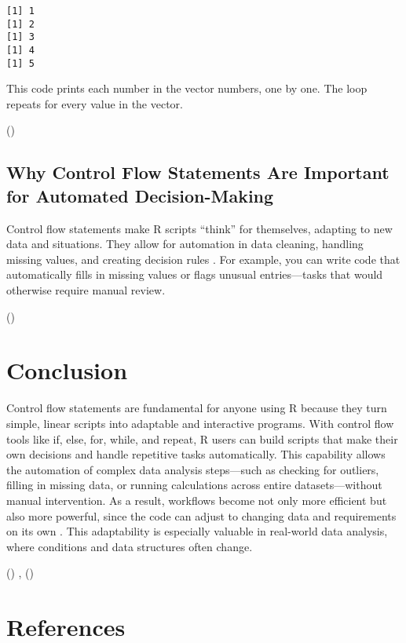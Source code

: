 \documentclass[
  man,
  floatsintext,
  longtable,
  nolmodern,
  notxfonts,
  notimes,
  colorlinks=true,linkcolor=blue,citecolor=blue,urlcolor=blue]{apa7}
\begin{document}
\begin{verbatim}
[1] 1
[1] 2
[1] 3
[1] 4
[1] 5
\end{verbatim}

This code prints each number in the vector numbers, one by one. The loop
repeats for every value in the vector.

()

\subsection{Why Control Flow Statements Are Important for Automated
Decision-Making}\label{why-control-flow-statements-are-important-for-automated-decision-making}

Control flow statements make R scripts ``think'' for themselves,
adapting to new data and situations. They allow for automation in data
cleaning, handling missing values, and creating decision rules . For
example, you can write code that automatically fills in missing values
or flags unusual entries---tasks that would otherwise require manual
review.

()

\section{Conclusion}\label{conclusion}

Control flow statements are fundamental for anyone using R because they
turn simple, linear scripts into adaptable and interactive programs.
With control flow tools like if, else, for, while, and repeat, R users
can build scripts that make their own decisions and handle repetitive
tasks automatically. This capability allows the automation of complex
data analysis steps---such as checking for outliers, filling in missing
data, or running calculations across entire datasets---without manual
intervention. As a result, workflows become not only more efficient but
also more powerful, since the code can adjust to changing data and
requirements on its own . This adaptability is especially valuable in
real-world data analysis, where conditions and data structures often
change.

() ,
()

\section{References}\label{references}
\end{document}
